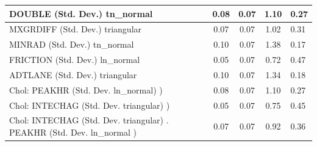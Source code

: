 \begin{table}
\begin{center}
\begin{tabular}{|l|l|c|c|c|l|}
			\hline
			DOUBLE (Std. Dev.) tn_normal &  & 0.08 & 0.07 & 1.10 & 0.27 \\
			\hline
			MXGRDIFF (Std. Dev.) triangular &  & 0.07 & 0.07 & 1.02 & 0.31 \\
			\hline
			MINRAD (Std. Dev.) tn_normal &  & 0.10 & 0.07 & 1.38 & 0.17 \\
			\hline
			FRICTION (Std. Dev.) ln_normal &  & 0.05 & 0.07 & 0.72 & 0.47 \\
			\hline
			ADTLANE (Std. Dev.) triangular &  & 0.10 & 0.07 & 1.34 & 0.18 \\
			\hline
			 Chol: PEAKHR (Std. Dev. ln_normal) ) &  & 0.08 & 0.07 & 1.10 & 0.27 \\
			\hline
			 Chol: INTECHAG (Std. Dev. triangular) ) &  & 0.05 & 0.07 & 0.75 & 0.45 \\
			\hline
			 Chol: INTECHAG (Std. Dev. triangular) . PEAKHR (Std. Dev.   ln_normal ) &  & 0.07 & 0.07 & 0.92 & 0.36 \\
			\hline
		\end{tabular}
	\end{center}
\end{table}